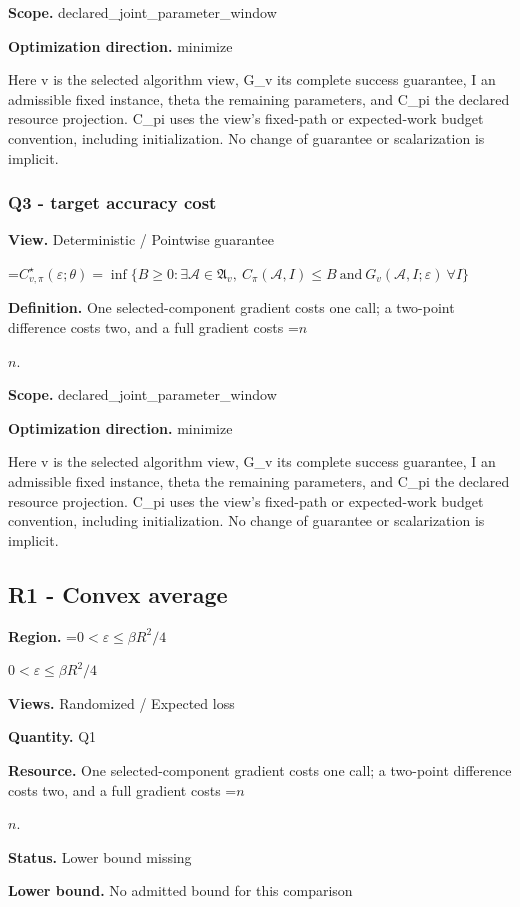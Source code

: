 \documentclass[10pt,a4paper]{article}
\newcommand{\AtlasMath}[1]{\par\begingroup\centering\setbox0=\hbox{$\displaystyle #1$}\ifdim\wd0>1.4\linewidth\typeout{ATLAS WIDE FORMULA: \the\wd0}\fi\ifdim\wd0>\linewidth\resizebox{\linewidth}{!}{\box0}\else\box0\fi\par\endgroup}
\newcommand{\AtlasInlineMath}[1]{\begingroup\setbox0=\hbox{$#1$}\ifdim\wd0>.4\linewidth\endgroup\AtlasMath{#1}\else\endgroup$#1$\fi}
\begin{document}
\textbf{Scope.} declared\_joint\_parameter\_window

\textbf{Optimization direction.} minimize

Here v is the selected algorithm view, G\_v its complete success guarantee, I an admissible fixed instance, theta the remaining parameters, and C\_pi the declared resource projection. C\_pi uses the view's fixed-path or expected-work budget convention, including initialization. No change of guarantee or scalarization is implicit.

\subsubsection{Q3 - target accuracy cost}
\textbf{View.} Deterministic / Pointwise guarantee

\AtlasMath{C^\star_{v,\pi}(\varepsilon;\theta)=\inf\{B\ge0:\exists\mathcal A\in\mathfrak A_v,\ C_\pi(\mathcal A,I)\le B\ \text{and}\ G_v(\mathcal A,I;\varepsilon)\ \forall I\}}
\textbf{Definition.} One selected-component gradient costs one call; a two-point difference costs two, and a full gradient costs \AtlasInlineMath{n}.

\textbf{Scope.} declared\_joint\_parameter\_window

\textbf{Optimization direction.} minimize

Here v is the selected algorithm view, G\_v its complete success guarantee, I an admissible fixed instance, theta the remaining parameters, and C\_pi the declared resource projection. C\_pi uses the view's fixed-path or expected-work budget convention, including initialization. No change of guarantee or scalarization is implicit.

\subsection{R1 - Convex average}
\textbf{Region.} \AtlasInlineMath{0<\varepsilon\le\beta R^2/4}

\textbf{Views.} Randomized / Expected loss

\textbf{Quantity.} Q1

\textbf{Resource.} One selected-component gradient costs one call; a two-point difference costs two, and a full gradient costs \AtlasInlineMath{n}.

\textbf{Status.} Lower bound missing

\textbf{Lower bound.} No admitted bound for this comparison
\end{document}

